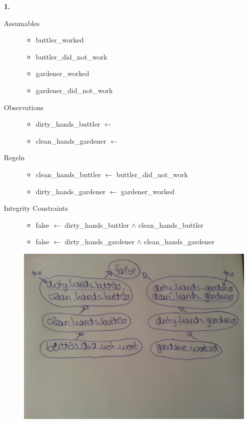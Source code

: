 \documentclass[a4paper,11pt]{article}
\author{\authorinfo}
\title{\titleinfo}
\date{\today}
\begin{document}
\maketitle
\begin{enumerate}
\item[\textbf{1.}]
    \begin{description}


    \item[Assumables]  \hfill
        \begin{itemize}
            \item buttler\_worked
            \item buttler\_did\_not\_work
            \item gardener\_worked
            \item gardener\_did\_not\_work
        \end{itemize}
    \item[Observations]  \hfill
        \begin{itemize}
            \item dirty_hands_buttler $\leftarrow$
            \item clean_hands_gardener $\leftarrow$
        \end{itemize}
    \item[Regeln]   \hfill
        \begin{itemize}
            \item clean\_hands\_buttler $\leftarrow$ buttler\_did\_not\_work
            \item dirty\_hands\_gardener $\leftarrow$ gardener\_worked
        \end{itemize}
    \item[Integrity Constraints]  \hfill
        \begin{itemize}
            \item false $\leftarrow$ dirty\_hands\_buttler $\wedge$ clean\_hands\_buttler
            \item false $\leftarrow$ dirty\_hands\_gardener $\wedge$ clean\_hands\_gardener
        \end{itemize}
    \includegraphics[scale=1]{aufgabe1_graph.jpg}   


\end{description}
\end{enumerate}
\end{document}
